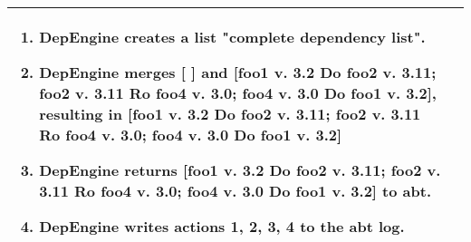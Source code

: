 \begin{tabularx}{\linewidth}{|l|X|}
\begin{minipage}{\linewidth}
\begin{enumerate}
   \item DepEngine creates a list "complete dependency list".
   \item DepEngine merges [ ] and [foo1 v. 3.2 Do foo2 v. 3.11;  foo2 v. 3.11 Ro foo4 v. 3.0; foo4 v. 3.0 Do foo1 v. 3.2], resulting in [foo1 v. 3.2 Do foo2 v. 3.11;  foo2 v. 3.11 Ro foo4 v. 3.0; foo4 v. 3.0 Do foo1 v. 3.2]   
   \item DepEngine returns [foo1 v. 3.2 Do foo2 v. 3.11;  foo2 v. 3.11 Ro foo4 v. 3.0; foo4 v. 3.0 Do foo1 v. 3.2] to abt.
   \item DepEngine writes actions 1, 2, 3, 4 to the abt log.
  \end{enumerate}
 \vspace{0.05em}
\end{minipage}
\\
\hline 
\end{tabularx}